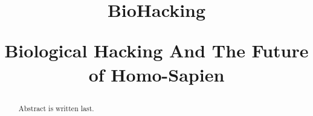 \documentclass{article}
\title{BioHacking \\
\begin{large} 
    Biological Hacking And The Future of Homo-Sapien
\end{large} }	%
\begin{document}
\maketitlepage
\newpage


\begin{abstract}
    Abstract is written last.
\end{abstract}
\newpage

\makeheader	%
\maketitle	%







\newpage
\makeworkscited
\end{document}
